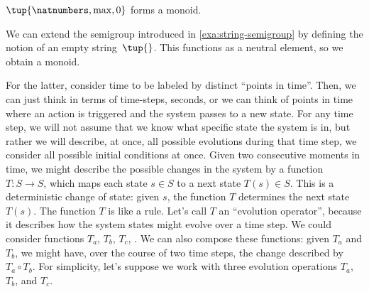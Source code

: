 \begin{example}
    $\tup{\natnumbers, \max,0}$ forms a monoid.
\end{example}

\begin{example}
    \label{exa:string-monoid}
    We can extend the semigroup introduced in \cref{exa:string-semigroup} by defining the notion of an empty string~$\tup{}$.
    This functions as a neutral element, so we obtain a monoid.
\end{example}

%
%
For the latter, consider time to be labeled by distinct ``points in time''.
Then, we can just think in terms of time-steps, \eg  seconds, or we can think of points in time where \eg  an action is triggered and the system passes to a new state.
%
For any time step, we will not assume that we know what specific state the system is in, but rather we will describe, at once, all possible evolutions during that time step, \ie  we consider all possible initial conditions at once.
Given two consecutive moments in time, we might describe the possible changes in the system by a function $T : S \rightarrow S$, which maps each state $s \in S$ to a next state $T(s) \in S$.
This is a deterministic change of state: given $s$, the function $T$ determines the next state $T(s)$.
The function $T$ is like a rule.
Let's call $T$ an ``evolution operator'', because it describes how the system states might evolve over a time step.
%
We could consider functions $T_a$, $T_b$, $T_c$, \etc.
We can also compose these functions: given $T_a$ and $T_b$, we might have, over the course of two time steps, the change described by $T_a \circ T_b$.
For simplicity, let's suppose we work with three evolution operations $T_a$, $T_b$, and $T_c$.
%
%
%
%
%

